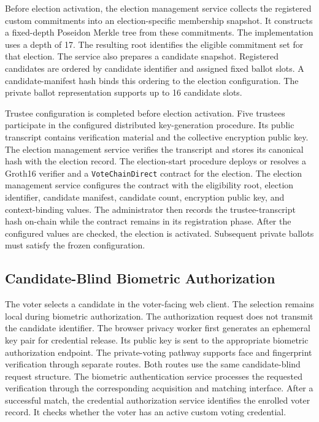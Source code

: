 Before election activation, the election management service collects the
registered custom commitments into an election-specific membership snapshot.
It constructs a fixed-depth Poseidon Merkle tree from these commitments. The
implementation uses a depth of 17. The resulting root identifies the
eligible commitment set for that election.
The service also prepares a candidate snapshot. Registered candidates are
ordered by candidate identifier and assigned fixed ballot slots. A
candidate-manifest hash binds this ordering to the election configuration.
The private ballot representation supports up to 16 candidate slots.

Trustee configuration is completed before election activation. Five trustees
participate in the configured distributed key-generation procedure. Its
public transcript contains verification material and the collective
encryption public key. The election management service verifies the
transcript and stores its canonical hash with the election record.
The election-start procedure deploys or resolves a Groth16 verifier and a
\texttt{VoteChainDirect} contract for the election. The election management
service configures the contract with the eligibility root, election
identifier, candidate manifest, candidate count, encryption public key, and
context-binding values.
The administrator then records the trustee-transcript hash on-chain while
the contract remains in its registration phase. After the configured values
are checked, the election is activated. Subsequent private ballots must
satisfy the frozen configuration.


\subsection{Candidate-Blind Biometric Authorization}
\label{subsec:architecture-biometric-authorization}

The voter selects a candidate in the voter-facing web client. The selection
remains local during biometric authorization. The authorization request does
not transmit the candidate identifier.
The browser privacy worker first generates an ephemeral key pair for
credential release. Its public key is sent to the appropriate biometric
authorization endpoint. The private-voting pathway supports face and
fingerprint verification through separate routes. Both routes use the same
candidate-blind request structure.
The biometric authentication service processes the requested verification
through the corresponding acquisition and matching interface. After a
successful match, the credential authorization service identifies the
enrolled voter record. It checks whether the voter has an active custom
voting credential.

